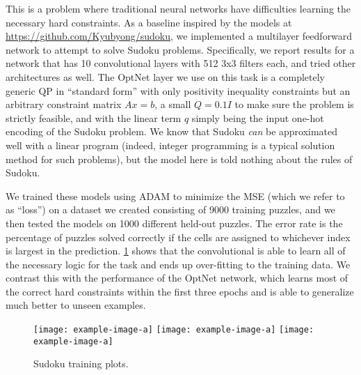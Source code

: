 This is a problem where traditional neural networks have difficulties learning
the necessary hard constraints.
As a baseline inspired by the models at
\url{https://github.com/Kyubyong/sudoku},
we implemented a multilayer feedforward network to attempt to solve
Sudoku problems. Specifically, we report results for a
network that has 10 convolutional layers with 512 3x3 filters each,
and tried other architectures as well.
The OptNet layer we use on this task is a completely generic QP in
``standard form'' with only positivity inequality constraints but an
arbitrary constraint matrix $Ax = b$, a small
$Q=0.1I$ to make sure the problem is strictly feasible, and with the linear term
$q$ simply being the input one-hot encoding of the Sudoku problem.
We know that Sudoku \emph{can} be approximated well with a linear program
(indeed, integer programming is a typical solution method for such problems),
but the model here is told nothing about the rules of Sudoku.

We trained these models using ADAM \citep{kingma2014adam} to
minimize the MSE (which we refer to as ``loss'') on a dataset
we created consisting of 9000 training puzzles, and we then tested
the models on 1000 different held-out puzzles.
The error rate is the percentage of puzzles solved correctly
if the cells are assigned to whichever index is largest in the prediction.
\cref{fig:sudoku:convergence} shows that the convolutional is
able to learn all of the necessary logic for the task and ends up
over-fitting to the training data.
We contrast this with the performance of the OptNet network,
which learns most of the correct hard constraints within the
first three epochs and is able to generalize much better to
unseen examples.

\begin{figure}[t]
    \centering
    \texttt{[image: example-image-a]}
    \texttt{[image: example-image-a]}
    \texttt{[image: example-image-a]}
    \caption{Sudoku training plots.}
    \label{fig:sudoku:convergence}
\end{figure}

